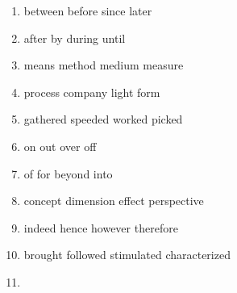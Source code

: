 \newpage
\begin{enumerate}
	\item


\fourchoices
{between}
{before}
{since}
{later}




\item


\fourchoices
{after}
{by}
{during}
{until}




\item


\fourchoices
{means}
{method}
{medium}
{measure}




\item


\fourchoices
{process}
{company}
{light}
{form}




\item


\fourchoices
{gathered}
{speeded}
{worked}
{picked}




\item


\fourchoices
{on}
{out}
{over}
{off}




\item


\fourchoices
{of}
{for}
{beyond}
{into}




\item


\fourchoices
{concept}
{dimension}
{effect}
{perspective}




\item


\fourchoices
{indeed}
{hence}
{however}
{therefore}




\item


\fourchoices
{brought}
{followed}
{stimulated}
{characterized}




\item



\end{enumerate}
